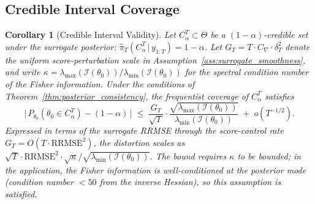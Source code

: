 \documentclass[12pt]{article}
\theoremstyle{plain}
\newtheorem{corollary}[theorem]{Corollary}
\theoremstyle{definition}
\theoremstyle{remark}
\newcommand{\given}{\,|\,}
\begin{document}
\subsection{Credible Interval Coverage}

\begin{corollary}[Credible Interval Validity]
\label{cor:coverage}
Let $C_\alpha^T \subset \Theta$ be a $(1-\alpha)$-credible set under the surrogate posterior: $\hat{\pi}_T(C_\alpha^T \given y_{1:T}) = 1-\alpha$. Let $G_T = T \cdot C_\nabla \cdot \delta_T^2$ denote the uniform score-perturbation scale in Assumption~\ref{ass:surrogate_smoothness}, and write $\kappa = \lambda_{\max}(\mathcal{I}(\theta_0)) / \lambda_{\min}(\mathcal{I}(\theta_0))$ for the spectral condition number of the Fisher information. Under the conditions of Theorem~\ref{thm:posterior_consistency}, the frequentist coverage of $C_\alpha^T$ satisfies
\begin{equation}
\bigl|\,P_{\theta_0}\!\left(\theta_0 \in C_\alpha^T\right) - (1 - \alpha)\,\bigr|
  \;\leq\; \frac{G_T}{\sqrt{T}} \cdot
    \frac{\sqrt{\lambda_{\max}(\mathcal{I}(\theta_0))}}{\lambda_{\min}(\mathcal{I}(\theta_0))}
  \;+\; o(T^{-1/2}).
\label{eq:coverage_bound}
\end{equation}
Expressed in terms of the surrogate RRMSE through the score-control rate $G_T = O(T \cdot \text{RRMSE}^2)$, the distortion scales as $\sqrt{T} \cdot \text{RRMSE}^2 \cdot \sqrt{\kappa}/\sqrt{\lambda_{\min}(\mathcal{I}(\theta_0))}$. The bound requires $\kappa$ to be bounded; in the application, the Fisher information is well-conditioned at the posterior mode (condition number $< 50$ from the inverse Hessian), so this assumption is satisfied.
\end{corollary}
\end{document}

